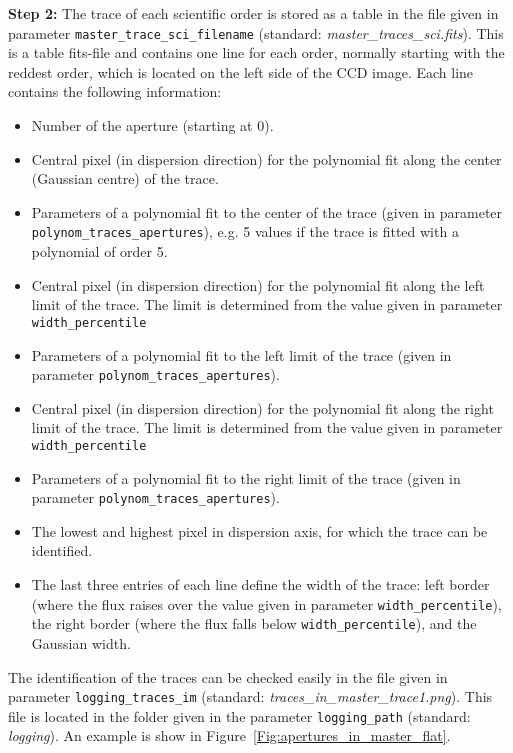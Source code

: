 \documentclass[10pt,a4paper]{article}
\begin{document}
\vspace{0.5em}\noindent \textbf{Step 2:} The trace of each scientific order is stored as a table in the file given in parameter \verb|master_trace_sci_filename| (standard: \textit{master\_traces\_sci.fits}). This is a table fits-file and contains one line for each order, normally starting with the reddest order, which is located on the left side of the CCD image. Each line contains the following information:
\begin{itemize}\setlength\itemsep{0em}
  \item Number of the aperture (starting at 0).
  \item Central pixel (in dispersion direction) for the polynomial fit along the center (Gaussian centre) of the trace.
  \item Parameters of a polynomial fit to the center of the trace (given in parameter \verb|polynom_traces_apertures|), e.g. 5 values if the trace is fitted with a polynomial of order 5.
  \item Central pixel (in dispersion direction) for the polynomial fit along the left limit of the trace. The limit is determined from the value given in parameter \verb|width_percentile|
  \item Parameters of a polynomial fit to the left limit of the trace (given in parameter \verb|polynom_traces_apertures|).
  \item Central pixel (in dispersion direction) for the polynomial fit along the right limit of the trace. The limit is determined from the value given in parameter \verb|width_percentile|
  \item Parameters of a polynomial fit to the right limit of the trace (given in parameter \verb|polynom_traces_apertures|).
  \item The lowest and highest pixel in dispersion axis, for which the trace can be identified.
  \item The last three entries of each line define the width of the trace: left border (where the flux raises over the value given in parameter \verb|width_percentile|), the right border (where the flux falls below \verb|width_percentile|), and the Gaussian width.
\end{itemize}
The identification of the traces can be checked easily in the file given in parameter \verb|logging_traces_im| (standard: \textit{traces\_in\_master\_trace1.png}). This file is located in the folder given in the parameter \verb|logging_path| (standard: \textit{logging}). An example is show in Figure~\ref{Fig:apertures_in_master_flat}.
\end{document}
